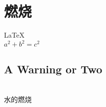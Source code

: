 \documentclass[UTF8]{article}
\begin{document}
       
 
\section{燃烧}          
\LaTeX \,\\ 
 $a^2+b^2=c^2$
 
 
\subsection{A Warning or Two}  

\\
水的燃烧
\end{document}
